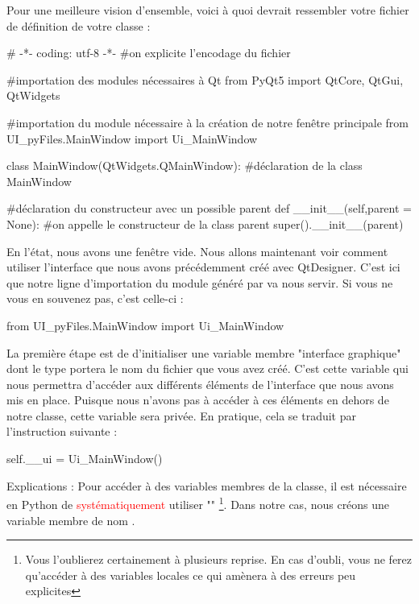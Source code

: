 \documentclass[12pt]{report}    %
\begin{document}


Pour une meilleure vision d'ensemble, voici à quoi devrait ressembler votre fichier de définition de votre classe  :
\begin{pyCode}
# -*- coding: utf-8 -*-
#on explicite l’encodage du fichier

#importation des modules nécessaires à Qt
from PyQt5 import QtCore, QtGui, QtWidgets

#importation du module nécessaire à la création de notre fenêtre principale
from UI_pyFiles.MainWindow import Ui_MainWindow

class MainWindow(QtWidgets.QMainWindow): #déclaration de la class MainWindow

	#déclaration du constructeur avec un possible parent
	def __init__(self,parent = None):
		#on appelle le constructeur de la class parent
		super().__init__(parent)
\end{pyCode}
\smallSkip
En l'état, nous avons une fenêtre vide. Nous allons maintenant voir comment utiliser l'interface que nous avons précédemment créé avec QtDesigner.\newline
C'est ici que notre ligne d'importation du module généré par  va nous servir. Si vous ne vous en souvenez pas, c'est celle-ci :
\begin{pyCode}
from UI_pyFiles.MainWindow import Ui_MainWindow
\end{pyCode}
La première étape est de d'initialiser une variable membre "interface graphique" dont le type portera le nom du fichier  que vous avez créé.\newline
C'est cette variable qui nous permettra d'accéder aux différents éléments de l'interface que nous avons mis en place.\newline
Puisque nous n'avons pas à accéder à ces éléments en dehors de notre classe, cette variable sera privée.\newline
En pratique, cela se traduit par l'instruction suivante :
\begin{pyCode}
self.__ui = Ui_MainWindow()
\end{pyCode}
Explications : 
Pour accéder à des variables membres de la classe, il est nécessaire en Python de \textcolor{red}{systématiquement} utiliser "\textcolor{blue}{}"
\footnote{Vous l'oublierez certainement à plusieurs reprise. En cas d'oubli, vous ne ferez qu'accéder à des variables locales ce qui amènera à des erreurs peu explicites}. Dans notre cas, nous créons une variable membre de nom .\newline
\end{document}
